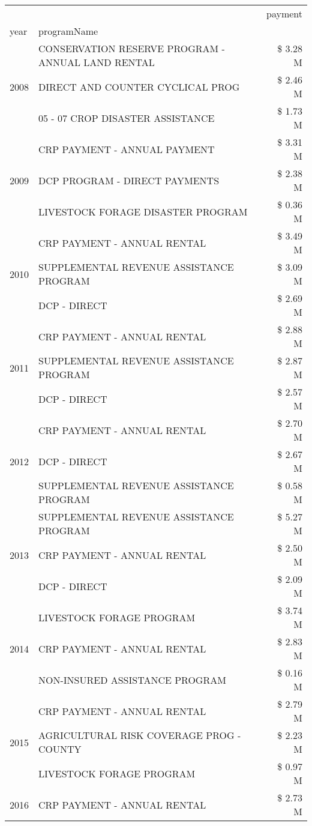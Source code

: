 \begin{tabular}{llr}
\toprule
 &  & payment \\
year & programName &  \\
\midrule
\multirow[t]{3}{*}{2008} & CONSERVATION RESERVE PROGRAM - ANNUAL LAND RENTAL & \$ 3.28 M \\
 & DIRECT AND COUNTER CYCLICAL PROG & \$ 2.46 M \\
 & 05 - 07 CROP DISASTER ASSISTANCE & \$ 1.73 M \\
\cline{1-3}
\multirow[t]{3}{*}{2009} & CRP PAYMENT - ANNUAL PAYMENT & \$ 3.31 M \\
 & DCP PROGRAM - DIRECT PAYMENTS & \$ 2.38 M \\
 & LIVESTOCK FORAGE DISASTER  PROGRAM & \$ 0.36 M \\
\cline{1-3}
\multirow[t]{3}{*}{2010} & CRP PAYMENT - ANNUAL RENTAL & \$ 3.49 M \\
 & SUPPLEMENTAL REVENUE ASSISTANCE PROGRAM & \$ 3.09 M \\
 & DCP - DIRECT & \$ 2.69 M \\
\cline{1-3}
\multirow[t]{3}{*}{2011} & CRP PAYMENT - ANNUAL RENTAL & \$ 2.88 M \\
 & SUPPLEMENTAL REVENUE ASSISTANCE PROGRAM & \$ 2.87 M \\
 & DCP - DIRECT & \$ 2.57 M \\
\cline{1-3}
\multirow[t]{3}{*}{2012} & CRP PAYMENT - ANNUAL RENTAL & \$ 2.70 M \\
 & DCP - DIRECT & \$ 2.67 M \\
 & SUPPLEMENTAL REVENUE ASSISTANCE PROGRAM & \$ 0.58 M \\
\cline{1-3}
\multirow[t]{3}{*}{2013} & SUPPLEMENTAL REVENUE ASSISTANCE PROGRAM & \$ 5.27 M \\
 & CRP PAYMENT - ANNUAL RENTAL & \$ 2.50 M \\
 & DCP - DIRECT & \$ 2.09 M \\
\cline{1-3}
\multirow[t]{3}{*}{2014} & LIVESTOCK FORAGE PROGRAM & \$ 3.74 M \\
 & CRP PAYMENT - ANNUAL RENTAL & \$ 2.83 M \\
 & NON-INSURED ASSISTANCE PROGRAM & \$ 0.16 M \\
\cline{1-3}
\multirow[t]{3}{*}{2015} & CRP PAYMENT - ANNUAL RENTAL & \$ 2.79 M \\
 & AGRICULTURAL RISK COVERAGE PROG - COUNTY & \$ 2.23 M \\
 & LIVESTOCK FORAGE PROGRAM & \$ 0.97 M \\
\cline{1-3}
\multirow[t]{3}{*}{2016} & CRP PAYMENT - ANNUAL RENTAL & \$ 2.73 M \\

\end{tabular}
